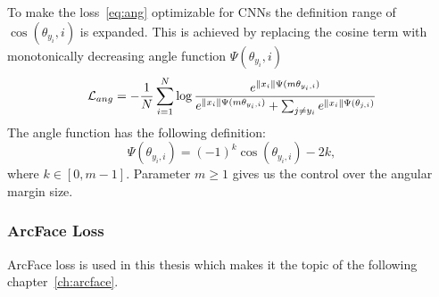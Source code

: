 To make the loss~\ref{eq:ang} optimizable for CNNs the definition range of $\cos(\theta_{y_i},i)$ is expanded.
This is achieved by replacing the cosine term with monotonically decreasing angle function $\Psi(\theta_{y_i},i)$
\begin{equation}
    \mathcal{L}_{ang} = -\frac{1}{N} \sum_{i=1}^{N} \log \frac{e^{\left\lVert x_i\right\rVert \Psi(m\theta_{y_i,i})}}
    {e^{\left\lVert x_i\right\rVert \Psi(m\theta_{y_i,i})} + \sum_{j \neq y_i} e^{\left\lVert x_{i}\right\rVert \Psi(\theta_{j,i})}}
\end{equation}
The angle function has the following definition:
\begin{equation}
    \Psi(\theta_{y_i,i}) = (-1)^{k} \cos(\theta_{y_{i},i}) -2k,
\end{equation}
where $k \in \left[ 0, m-1 \right]$.
Parameter $m \geq 1$ gives us the control over the angular margin size.


\subsubsection{ArcFace Loss}\label{subsubsec:arcface}
ArcFace loss is used in this thesis which makes it the topic of the following chapter~\ref{ch:arcface}.